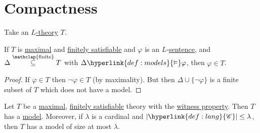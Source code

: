 \documentclass{article}
\let\models\vDash
\newcommand{\named}[1]{\textbf{#1}\index{#1}}
\begin{document}
\section{Compactness}
\begin{ndef}\label{def:5.1}
  Take an \hyperlink{def:ltheory}{$L$-theory} $T$.
\end{ndef}
\begin{nlemma}\label{lem:5.2}
  If $T$ is \hyperlink{def:maximal}{maximal} and \hyperlink{def:fs}{finitely satisfiable} and $\varphi$ is an $L$-\hyperlink{def:sentence}{sentence}, and $\Delta \overset{\mathclap{\text{finite}}}\subseteq T$ with $\Delta \hyperlink{def:models}{\models} \varphi$, then $\varphi \in T$.
\end{nlemma}
\begin{proof}
  If $\varphi \in T$ then $\neg \varphi \in T$ (by maximality).
  But then $\Delta \cup \{\neg \varphi\}$ is a finite subset of $T$ which does not have a model.
\end{proof}
\begin{nlemma}\label{lem:5.3}
  Let $T$ be a \hyperlink{def:maximal}{maximal}, \hyperlink{def:fs}{finitely satisfiable} theory with the \hyperlink{def:wp}{witness property}.
  Then $T$ has a \hyperlink{def:model}{model}.
  Moreover, if $\lambda$ is a cardinal and $|\hyperlink{def:lang}{\mathscr{C}}| \leq \lambda$, then $T$ has a model of size at most $\lambda$.
\end{nlemma}
\end{document}
